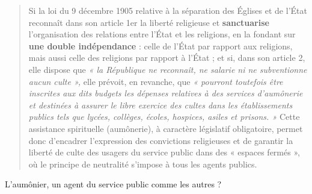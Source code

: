 \begin{quote}
Si la loi du 9 décembre 1905 relative à la séparation des Églises et de
l'État reconnaît dans son article 1er la liberté religieuse et
\textbf{sanctuarise} l'organisation des relations entre l'État et les
religions, en la fondant sur \textbf{une double indépendance} : celle de
l'État par rapport aux religions, mais aussi celle des religions par
rapport à l'État ; et si, dans son article 2, elle dispose que \emph{«
la République ne reconnaît, ne salarie ni ne subventionne aucun culte
»,} elle prévoit, en revanche, que \emph{« pourront toutefois être
inscrites aux dits budgets les dépenses relatives à des services
d'aumônerie et destinées à assurer le libre exercice des cultes dans les
établissements publics tels que lycées, collèges, écoles, hospices,
asiles et prisons. »} Cette assistance spirituelle (aumônerie), à
caractère législatif obligatoire, permet donc d'encadrer l'expression
des convictions religieuses et de garantir la liberté de culte des
usagers du service public dans des « espaces fermés », où le principe de
neutralité s'impose à tous les agents publics.
\end{quote}

L'aumônier, un agent du service public comme les autres ?

